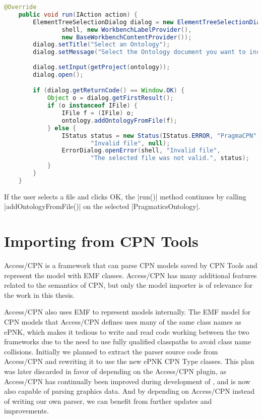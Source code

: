 \begin{lstlisting}[language=Java,float,label=lst:AddOntologyAction_run,
caption=AddOntologyAction run()]
	@Override
	public void run(IAction action) {
		ElementTreeSelectionDialog dialog = new ElementTreeSelectionDialog(
				shell, new WorkbenchLabelProvider(),
				new BaseWorkbenchContentProvider());
		dialog.setTitle("Select an Ontology");
		dialog.setMessage("Select the Ontology document you want to include in the net:");
		
		dialog.setInput(getProject(ontology));
		dialog.open();

		if (dialog.getReturnCode() == Window.OK) {
			Object o = dialog.getFirstResult();
			if (o instanceof IFile) {
				IFile f = (IFile) o;
				ontology.addOntologyFromFile(f);
			} else {
				IStatus status = new Status(IStatus.ERROR, "PragmaCPN", 0,
						"Invalid file", null);
				ErrorDialog.openError(shell, "Invalid file",
						"The selected file was not valid.", status);
			}
		}
	}
\end{lstlisting}

If the user selects a file and clicks OK, the |run()| method continues by
calling |addOntologyFromFile()| on the selected |PragmaticsOntology|.


\section{Importing from CPN Tools}
Access/CPN is a framework that can parse CPN models saved by CPN Tools and
represent the model with EMF classes. Access/CPN has many additional features
related to the semantics of CPN, but only the model importer is of relevance for
the work in this thesis.

Access/CPN also uses EMF to represent models internally. The EMF model for CPN
models that Access/CPN defines uses many of the same class names as ePNK, which
makes it tedious to write and read code working between the two frameworks due
to the need to use fully qualified classpaths to avoid class name collisions.
Initially we planned to extract the parser source code from Access/CPN and
rewriting it to use the new ePNK CPN Type classes. This plan was later discarded
in favor of depending on the Access/CPN plugin, as Access/CPN has continually
been improved during development of \thename{}, and is now also capable of
parsing graphics data. And by depending on Access/CPN instead of writing our own
parser, we can benefit from further updates and improvements.

